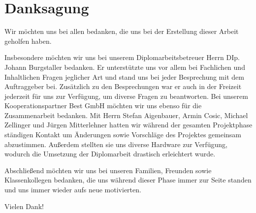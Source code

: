 \chapter*{Danksagung} 

Wir möchten uns bei allen bedanken, die uns bei der Erstellung dieser Arbeit geholfen haben.

Insbesondere möchten wir uns bei unserem Diplomarbeitsbetreuer Herrn DIp. Johann Burgstaller bedanken. Er unterstützte uns vor allem bei Fachlichen und Inhaltlichen Fragen jeglicher Art und stand uns bei jeder Besprechung mit dem Auftraggeber bei. Zusätzlich zu den Besprechungen war er auch in der Freizeit jederzeit für uns zur Verfügung, um diverse Fragen zu beantworten.
Bei unserem Kooperationspartner Best GmbH möchten wir uns ebenso für die Zusammenarbeit bedanken. Mit Herrn Stefan Aigenbauer, Armin Cosic, Michael Zellinger und Jürgen Mitterlehner hatten wir während der gesamten Projektphase ständigen Kontakt um Änderungen sowie Vorschläge des Projektes gemeinsam abzustimmen. Außerdem stellten sie uns diverse Hardware zur Verfügung, wodurch die Umsetzung der Diplomarbeit drastisch erleichtert wurde.

Abschließend möchten wir uns bei unseren Familien, Freunden sowie Klassenkollegen bedanken, die uns während dieser Phase immer zur Seite standen und uns immer wieder aufs neue motivierten.

Vielen Dank!

